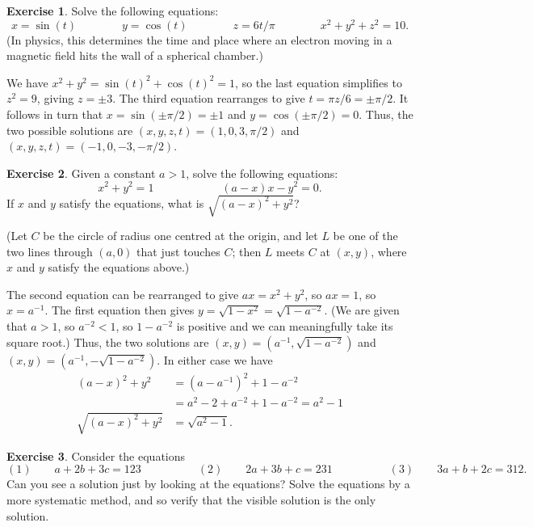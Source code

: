 \documentclass[a4paper]{amsart}
\theoremstyle{definition}
\newtheorem{exercise}{Exercise}[section]
\newenvironment{solution}{{\noindent \bf Solution:}}{}
\begin{document}
\begin{exercise}\label{ex-helix-sphere}
Solve the following equations:
 \[
  x = \sin(t) \hspace{4em}
  y = \cos(t) \hspace{4em}
  z = 6t/\pi  \hspace{4em}
  x^2+y^2+z^2 = 10.
 \]
 (In physics, this determines the time and place where an electron
 moving in a magnetic field hits the wall of a spherical chamber.)
\end{exercise}
\begin{solution}
We have $x^2+y^2=\sin(t)^2+\cos(t)^2=1$, so the last equation
 simplifies to $z^2=9$, giving $z=\pm 3$.  The third equation
 rearranges to give $t=\pi z/6=\pm \pi/2$.  It follows in turn that
 $x=\sin(\pm\pi/2)=\pm 1$ and $y=\cos(\pm\pi/2)=0$.  Thus, the two
 possible solutions are $(x,y,z,t)=(1,0,3,\pi/2)$ and
 $(x,y,z,t)=(-1,0,-3,-\pi/2)$.
\end{solution}
\begin{exercise}\label{ex-circ-tangent}
 Given a constant $a>1$, solve the following equations:
 \[ x^2+y^2 = 1 \hspace{6em} (a-x)x - y^2 = 0. \]
 If $x$ and $y$ satisfy the equations, what is $\sqrt{(a-x)^2+y^2}$?

 (Let $C$ be the circle of radius one centred at the origin, and let
 $L$ be one of the two lines through $(a,0)$ that just touches $C$;
 then $L$ meets $C$ at $(x,y)$, where $x$ and $y$ satisfy the
 equations above.)
\end{exercise}
\begin{solution}
 The second equation can be rearranged to give $ax=x^2+y^2$, so
 $ax=1$, so $x=a^{-1}$.  The first equation then gives
 $y=\sqrt{1-x^2}=\sqrt{1-a^{-2}}$.  (We are given that $a>1$, so
 $a^{-2}<1$, so $1-a^{-2}$ is positive and we can meaningfully take
 its square root.)  Thus, the two solutions are
 $(x,y)=(a^{-1},\sqrt{1-a^{-2}})$ and
 $(x,y)=(a^{-1},-\sqrt{1-a^{-2}})$.  In either case we have
 \begin{align*}
  (a-x)^2+y^2 &= (a-a^{-1})^2 + 1 - a^{-2} \\
   &= a^2 - 2 + a^{-2} + 1 - a^{-2} = a^2 - 1 \\
  \sqrt{(a-x)^2+y^2} &= \sqrt{a^2-1}.
 \end{align*}
\end{solution}
\begin{exercise}\label{ex-linear-decimal}
 Consider the equations
 \[
   (1) \qquad a + 2b + 3c = 123 \hspace{5em}
   (2) \qquad 2a + 3b +  c = 231 \hspace{5em}
   (3) \qquad 3a +  b + 2c = 312.
 \]
 Can you see a solution just by looking at the equations?  Solve the
 equations by a more systematic method, and so verify that the visible
 solution is the only solution.
\end{exercise}
\end{document}
